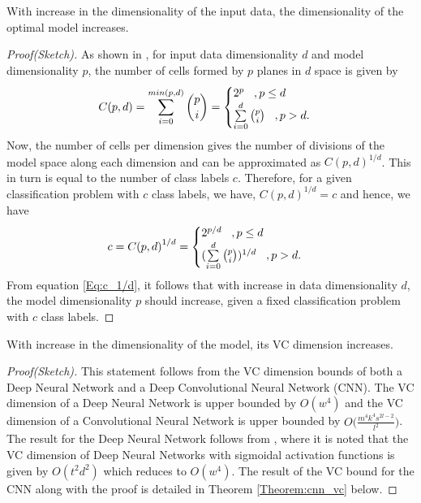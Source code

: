 \documentclass[11pt,a4paper]{article}
\begin{document}
\begin{lemma}\label{Lemma:data_model}
With increase in the dimensionality of the input data, the dimensionality of the optimal model increases.
\end{lemma}
\begin{proof}[Proof(Sketch)] As shown in \cite{Makhoul1989}, for input data dimensionality $d$ and model dimensionality $p$, the number of cells formed by $p$ planes in $d$ space is given by
\begin{equation}\label{Eq:C(p,d)}
C(p,d) = \sum\limits_{i=0}^{min(p,d)} {{p}\choose{i}} =
\begin{cases}
2^p
\hspace{3mm}   ,p \leq d  \\
\sum\limits_{i=0}^d {{p}\choose{i}}
\hspace{3mm} ,p>d.
\end{cases}
\end{equation}
Now, the number of cells per dimension gives the number of divisions of the model space along each dimension and can be approximated as $C(p,d)^{1/d}$. This in turn is equal to the number of class labels $c$. Therefore, for a given classification problem with $c$ class labels, we have, ${C(p,d)}^{1/d} = c$ and hence, we have
\begin{equation}\label{Eq:c_1/d}
c = {C(p,d)}^{1/d} =
\begin{cases}
2^{p/d}
\hspace{3mm}   ,p \leq d  \\
(\sum\limits_{i=0}^d {{p}\choose{i}})^{1/d}
\hspace{3mm} ,p>d.
\end{cases}
\end{equation}
From equation \ref{Eq:c_1/d}, it follows that with increase in data dimensionality $d$, the model dimensionality $p$ should increase, given a fixed classification problem with $c$ class labels. 
\end{proof}
\begin{lemma}\label{Lemma:data_vc}
With increase in the dimensionality of the model, its VC dimension increases.
\end{lemma}
\begin{proof}[Proof(Sketch)] This statement follows from the VC dimension bounds of both a Deep Neural Network and a Deep Convolutional Neural Network (CNN). The VC dimension of a Deep Neural Network is upper bounded by $O(w^4)$ and the VC dimension of a Convolutional Neural Network is upper bounded by $O\Big(\frac{m^4k^4s^{2l-2}}{l^2}\Big)$. The result for the Deep Neural Network follows from \cite{Bartlett_vapnik-chervonenkisdimension}, where it is noted that the VC dimension of Deep Neural Networks with sigmoidal activation functions is given by $O(t^2d^2)$ which reduces to $O(w^4)$. The result of the VC bound for the CNN along with the proof is detailed in Theorem \ref{Theorem:cnn_vc} below.  
\end{proof}
\end{document}
